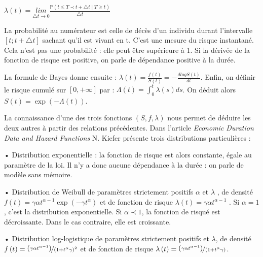 \documentclass[12pt,a4paper]{article}
\begin{document}
$\lambda\left(t\right)=\underset{\triangle t\rightarrow0}{lim}\frac{\mathbb{P}\left(t\leq T\prec t+\triangle t\mid T\geq t\right)}{\triangle t}$

La probabilité au numérateur est celle de décès d’un individu durant l’intervalle $\left[t;t+\triangle t\right]$ sachant qu’il est vivant en t. C’est une mesure du risque instantané. Cela n’est pas une probabilité : elle peut être supérieure à 1. Si la dérivée de la fonction de risque est positive, on parle de dépendance positive à la durée.

La formule de Bayes donne ensuite : $\lambda\left(t\right)=\frac{f\left(t\right)}{S\left(t\right)}=-\frac{dlogS\left(t\right)}{dt}$. Enfin, on définir le risque cumulé \varLambda sur $\left[0,+\infty\right]$ par : $\varLambda\left(t\right)=\int_{0}^{t}\lambda\left(s\right)ds$. On déduit alors $S\left(t\right)=\exp\left(-\varLambda\left(t\right)\right)$.

La connaissance d’une des trois fonctions $\left(S,f,\lambda\right)$
  nous permet de déduire les deux autres à partir des relations précédentes. Dans l’article \textit{Economic Duration Data and Hazard Functions} N. Kiefer présente trois distributions particulières :

• Distribution exponentielle : la fonction de risque est alors constante, égale au paramètre de la loi. Il n’y a donc aucune dépendance à la durée : on parle de modèle sans mémoire.

• Distribution de Weibull de paramètres strictement positifs $\alpha$
  et $\lambda$
 , de densité $f\left(t\right)=\gamma\alpha t^{\alpha-1}\exp\left(-\gamma t^{\alpha}\right)$
  et de fonction de risque $\lambda\left(t\right)=\gamma\alpha t^{\alpha-1}$
 . Si $\alpha=1$
 , c’est la distribution exponentielle. Si $\alpha\prec1$, la fonction de risqué est décroissante. Dans le cas contraire, elle est croissante.

• Distribution log-logistique de paramètres strictement positifs \alpha
  et $\lambda$, de densité $f\left(t\right)=\nicefrac{\left(\gamma\alpha t^{\alpha-1}\right)}{\left(1+t^{\alpha}\gamma\right)^{2}}$
 et de fonction de risque $\lambda\left(t\right)=\nicefrac{\left(\gamma\alpha t^{\alpha-1}\right)}{\left(1+t^{\alpha}\gamma\right)}$.

\paragraph{}
\end{document}
